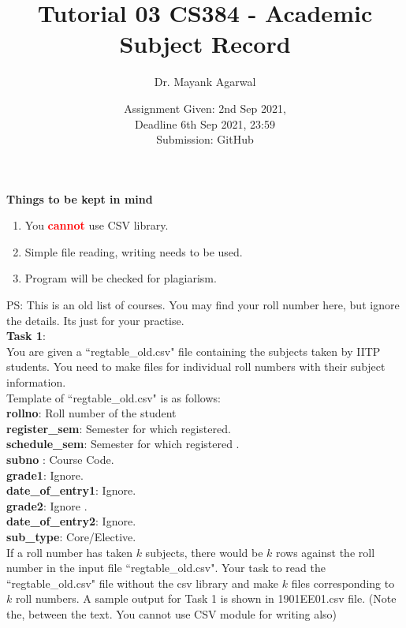 \documentclass[12pt,  letterpaper,  twoside]{article}
\title{Tutorial 03 CS384 -  Academic Subject Record }
\author{Dr. Mayank Agarwal}
\date{Assignment Given: 2nd Sep 2021,\\ Deadline 6th Sep 2021,  
23:59\\Submission: GitHub }
\begin{document}
	\maketitle  
	\textbf{Things to be kept in mind}\\
	\begin{enumerate}
		\item You \textcolor{red}{\textbf{cannot}} use CSV library.  
		\item  Simple file reading, writing needs to be used.
		\item Program will be checked for plagiarism.  
	\end{enumerate}
	
PS: This is an old list of courses. You may find your roll number here, but 
ignore the details. Its  just for your practise. \\

\textbf{Task 1}:\\ You are given a ``regtable\_old.csv" file containing the 
subjects taken by IITP students. You need to make files for individual roll 
numbers with their subject information.\\

\noindent Template of ``regtable\_old.csv" is as follows:\\
\noindent \textbf{rollno}: Roll number of the student \\
	\textbf{register\_sem}: Semester for which registered. \\	
		\textbf{schedule\_sem}: Semester for which registered	. \\
		\textbf{subno}	: Course Code. \\
		\textbf{grade1}: Ignore. \\
			\textbf{date\_of\_entry1}: Ignore. \\
				\textbf{grade2}: Ignore	. \\
	\textbf{date\_of\_entry2}: Ignore. \\
		\textbf{sub\_type}: Core/Elective. \\


If a roll number has taken $ k $ subjects, there would be $ k $ rows against 
the roll number in the input file   ``regtable\_old.csv". Your task to read 
the  
``regtable\_old.csv" file without the csv library and make $ k $ files 
corresponding to $ k $ roll numbers. A sample output for Task 1 is shown in 
1901EE01.csv  file. (Note the, between the text. You cannot use CSV 
module for writing also)\\
\end{document}
